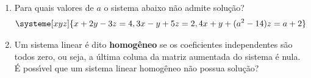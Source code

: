 \documentclass[a4paper,5pt]{amsbook}
\begin{document}
\begin{enumerate}
	\vspace{0.5cm}
	\item Para quais valores de $a$ o sistema abaixo n\~ao admite solu\c{c}\~ao?
		\[\systeme[xyz]{
				x + 2y - 3z = 4,
				3x - y + 5z = 2,
				4x + y + {(a^2-14)}z = a+2
			}\]

 	\vspace{0.5cm}
 	\item Um sistema linear \'e dito \textbf{homog\^eneo} se os coeficientes
 		independentes s\~ao todos zero, ou seja, a \'ultima coluna da matriz
 		aumentada do sistema \'e nula. \'{E} poss\'{\i}vel que um sistema linear
 		homog\^eneo n\~ao possua solu\c{c}\~ao?
\end{enumerate}
\end{document}
